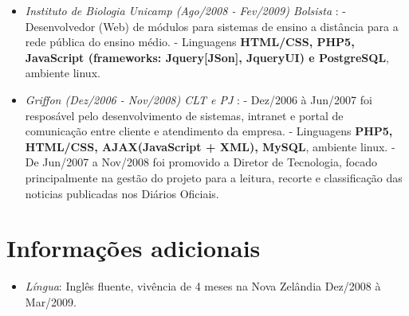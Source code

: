 \documentclass[a4paper,10pt]{article}
\begin{document}
\begin{itemize}
\item \emph{Instituto de Biologia Unicamp (Ago/2008 - Fev/2009) Bolsista }: 
  \subitem - Desenvolvedor (Web) de módulos para sistemas de ensino a distância para a rede pública do ensino médio.
  \subitem - Linguagens \textbf{HTML/CSS, PHP5, JavaScript (frameworks: Jquery[JSon], JqueryUI) e PostgreSQL}, ambiente linux.

\item \emph{Griffon (Dez/2006 - Nov/2008) CLT e PJ }: 
  \subitem - Dez/2006 à Jun/2007 foi resposável pelo desenvolvimento de sistemas, intranet e portal de comunicação entre cliente e atendimento da empresa. 
  \subitem - Linguagens \textbf{PHP5, HTML/CSS, AJAX(JavaScript + XML), MySQL}, ambiente linux.
  \subitem - De Jun/2007 a Nov/2008 foi promovido a Diretor de Tecnologia, focado principalmente na gestão do projeto para a leitura, recorte e classificação das noticias publicadas nos Diários Oficiais. 

\end{itemize}
\section{Informações adicionais}
\begin{itemize}
\item \emph{Língua}: Inglês fluente, vivência de 4 meses na Nova Zelândia Dez/2008 à Mar/2009.
\end{itemize}
\end{document}
